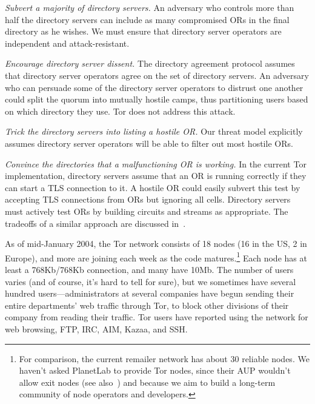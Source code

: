 \documentclass[times,10pt,twocolumn]{article}
\begin{document}
\emph{Subvert a majority of directory servers.} An adversary who controls
more than half the directory servers can include as many compromised
ORs in the final directory as he wishes. We must ensure that directory
server operators are independent and attack-resistant.

\emph{Encourage directory server dissent.}  The directory
agreement protocol assumes that directory server operators agree on
the set of directory servers.  An adversary who can persuade some
of the directory server operators to distrust one another could
split the quorum into mutually hostile camps, thus partitioning
users based on which directory they use.  Tor does not address
this attack.

\emph{Trick the directory servers into listing a hostile OR.}
Our threat model explicitly assumes directory server operators will
be able to filter out most hostile ORs.

\emph{Convince the directories that a malfunctioning OR is
working.}  In the current Tor implementation, directory servers
assume that an OR is running correctly if they can start a TLS
connection to it.  A hostile OR could easily subvert this test by
accepting TLS connections from ORs but ignoring all cells. Directory
servers must actively test ORs by building circuits and streams as
appropriate.  The tradeoffs of a similar approach are discussed
in~\cite{mix-acc}.\\

\label{sec:in-the-wild}

As of mid-January 2004, the Tor network consists of 18 nodes
(16 in the US, 2 in Europe), and more are joining each week as the code
matures.\footnote{For comparison, the current remailer network
has about 30 reliable nodes. We haven't asked PlanetLab to provide
Tor nodes, since their AUP wouldn't allow exit nodes (see
also~\cite{darkside}) and because we aim to build a long-term community of
node operators and developers.} Each node has at least a 768Kb/768Kb
connection, and
many have 10Mb. The number of users varies (and of course, it's hard to
tell for sure), but we sometimes have several hundred users---administrators at
several companies have begun sending their entire departments' web
traffic through Tor, to block other divisions of
their company from reading their traffic. Tor users have reported using
the network for web browsing, FTP, IRC, AIM, Kazaa, and SSH.
\end{document}
